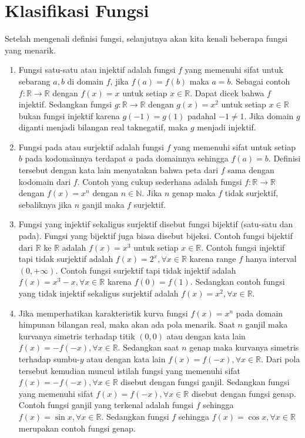 \documentclass{article}
\begin{document}
\section{Klasifikasi Fungsi}

Setelah mengenali definisi fungsi, selanjutnya akan kita kenali beberapa fungsi yang menarik.
\begin{enumerate}
\item Fungsi satu-satu atau injektif adalah fungsi $f$ yang memenuhi sifat untuk sebarang $a,b$ di domain $f$, jika $f(a) = f(b)$ maka $a = b$. Sebagai contoh $f : \mathbb{R} \rightarrow \mathbb{R}$ dengan $f(x) = x$ untuk setiap $x \in \mathbb{R}$. Dapat dicek bahwa $f$ injektif. Sedangkan fungsi $g : \mathbb{R} \rightarrow \mathbb{R}$ dengan $g(x) = x^2$ untuk setiap $x \in \mathbb{R}$ bukan fungsi injektif karena $g(-1) = g(1)$ padahal $-1 \ne 1$. Jika domain $g$ diganti menjadi bilangan real taknegatif, maka $g$ menjadi injektif.
\item Fungsi pada atau surjektif adalah fungsi $f$ yang memenuhi sifat untuk setiap $b$ pada kodomainnya terdapat $a$ pada domainnya sehingga $f(a) = b$. Definisi tersebut dengan kata lain menyatakan bahwa peta dari $f$ sama dengan kodomain dari $f$. Contoh yang cukup sederhana adalah fungsi $f : \mathbb{R} \rightarrow \mathbb{R}$ dengan $f(x) = x^n$ dengan $n \in \mathbb{N}$. Jika $n$ genap maka $f$ tidak surjektif, sebaliknya jika $n$ ganjil maka $f$ surjektif.
\item Fungsi yang injektif sekaligus surjektif disebut fungsi bijektif (satu-satu dan pada). Fungsi yang bijektif juga biasa disebut bijeksi. Contoh fungsi bijektif dari $\mathbb{R}$ ke $\mathbb{R}$ adalah $f(x) = x^3$ untuk setiap $x \in \mathbb{R}$. Contoh fungsi injektif tapi tidak surjektif adalah $f(x) = 2^x, \forall x \in \mathbb{R}$ karena range $f$ hanya interval $(0, +\infty)$. Contoh fungsi surjektif tapi tidak injektif adalah $f(x) = x^3 - x, \forall x \in \mathbb{R}$ karena $f(0) = f(1)$. Sedangkan contoh fungsi yang tidak injektif sekaligus surjektif adalah $f(x) = x^2, \forall x \in \mathbb{R}$.
\item Jika memperhatikan karakteristik kurva fungsi $f(x) = x^n$ pada domain himpunan bilangan real, maka akan ada pola menarik. Saat $n$ ganjil maka kurvanya simetris terhadap titik $(0,0)$ atau dengan kata lain $f(x) = -f(-x), \forall x \in \mathbb{R}$. Sedangkan saat $n$ genap maka kurvanya simetris terhadap sumbu-$y$ atau dengan kata lain $f(x) = f(-x), \forall x \in \mathbb{R}$. Dari pola tersebut kemudian muncul istilah fungsi yang memenuhi sifat $f(x) = -f(-x), \forall x \in \mathbb{R}$ disebut dengan fungsi ganjil. Sedangkan fungsi yang memenuhi sifat $f(x) = f(-x), \forall x \in \mathbb{R}$ disebut dengan fungsi genap. Contoh fungsi ganjil yang terkenal adalah fungsi $f$ sehingga $f(x) = \sin x, \forall x \in \mathbb{R}$. Sedangkan fungsi $f$ sehingga $f(x) = \cos x, \forall x \in \mathbb{R}$ merupakan contoh fungsi genap.

\end{enumerate}
\end{document}
